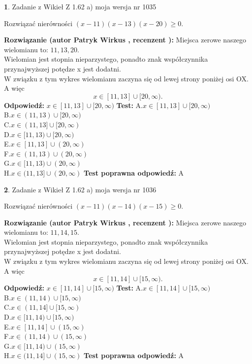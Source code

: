 \documentclass[12pt, a4paper]{article}
\theoremstyle{definition} %
\newtheorem{zad}{}
\newcommand{\zadStart}[1]{\begin{zad}#1\newline}
\newcommand{\zadStop}{\end{zad}}
\newcommand{\rozwStart}[2]{\noindent \textbf{Rozwiązanie (autor #1 , recenzent #2): }\newline}
\newcommand{\rozwStop}{\newline}
\newcommand{\odpStart}{\noindent \textbf{Odpowiedź:}\newline}
\newcommand{\odpStop}{\newline}
\newcommand{\testStart}{\noindent \textbf{Test:}\newline}
\newcommand{\testStop}{\newline}
\newcommand{\kluczStart}{\noindent \textbf{Test poprawna odpowiedź:}\newline}
\newcommand{\kluczStop}{\newline}
\begin{document}
\zadStart{Zadanie z Wikieł Z 1.62 a) moja wersja nr 1035}

Rozwiązać nierówności $(x-11)(x-13)(x-20)\ge0$.
\zadStop
\rozwStart{Patryk Wirkus}{}
Miejsca zerowe naszego wielomianu to: $11, 13, 20$.\\
Wielomian jest stopnia nieparzystego, ponadto znak współczynnika przy\linebreak najwyższej potędze x jest dodatni.\\ W związku z tym wykres wielomianu zaczyna się od lewej strony poniżej osi OX. A więc $$x \in [11,13] \cup [20,\infty).$$
\rozwStop
\odpStart
$x \in [11,13] \cup [20,\infty)$
\odpStop
\testStart
A.$x \in [11,13] \cup [20,\infty)$\\
B.$x \in (11,13) \cup [20,\infty)$\\
C.$x \in (11,13] \cup [20,\infty)$\\
D.$x \in [11,13) \cup [20,\infty)$\\
E.$x \in [11,13] \cup (20,\infty)$\\
F.$x \in (11,13) \cup (20,\infty)$\\
G.$x \in [11,13) \cup (20,\infty)$\\
H.$x \in (11,13] \cup (20,\infty)$
\testStop
\kluczStart
A
\kluczStop



\zadStart{Zadanie z Wikieł Z 1.62 a) moja wersja nr 1036}

Rozwiązać nierówności $(x-11)(x-14)(x-15)\ge0$.
\zadStop
\rozwStart{Patryk Wirkus}{}
Miejsca zerowe naszego wielomianu to: $11, 14, 15$.\\
Wielomian jest stopnia nieparzystego, ponadto znak współczynnika przy\linebreak najwyższej potędze x jest dodatni.\\ W związku z tym wykres wielomianu zaczyna się od lewej strony poniżej osi OX. A więc $$x \in [11,14] \cup [15,\infty).$$
\rozwStop
\odpStart
$x \in [11,14] \cup [15,\infty)$
\odpStop
\testStart
A.$x \in [11,14] \cup [15,\infty)$\\
B.$x \in (11,14) \cup [15,\infty)$\\
C.$x \in (11,14] \cup [15,\infty)$\\
D.$x \in [11,14) \cup [15,\infty)$\\
E.$x \in [11,14] \cup (15,\infty)$\\
F.$x \in (11,14) \cup (15,\infty)$\\
G.$x \in [11,14) \cup (15,\infty)$\\
H.$x \in (11,14] \cup (15,\infty)$
\testStop
\kluczStart
A
\kluczStop
\end{document}

